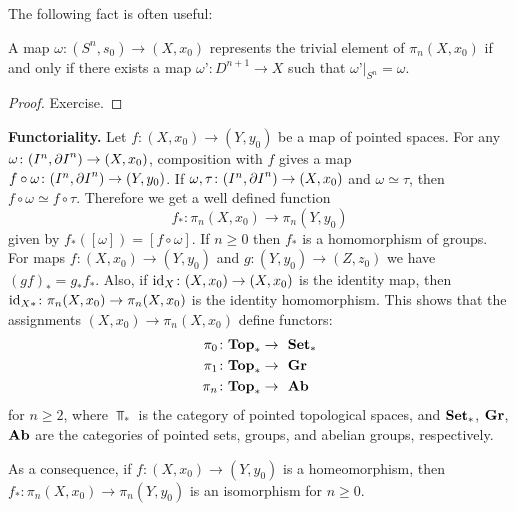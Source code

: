The following fact is often useful:

\begin{proposition}
\label{PIN TRIVAL ELT}
A map $\omega \colon (S^{n}, s_{0}) \to (X, x_{0})$ represents the trivial 
element of $\pi_{n}(X, x_{0})$ if and only if there exists a map 
$\omega’\colon D^{n+1} \to X$ such that $\omega’|_{S^{n}} = \omega$.
\end{proposition}

\begin{proof}
Exercise.
\end{proof}


\begin{nn} {\bf Functoriality.}
Let $f\colon (X, x_{0}) \to (Y, y_{0})$ be a map of pointed spaces. 
For any $\omega\colon (I^{n}, {\partial I}^{n})\to (X, x_{0})$, composition with 
$f$ gives a map $f\circ \omega \colon (I^{n}, {\partial I}^{n}) \to (Y, y_{0})$. 
If $\omega,  \tau \colon (I^{n}, {\partial I}^{n})\to (X, x_{0})$ and $\omega \simeq \tau$, 
then $f\circ \omega\simeq f\circ \tau$. Therefore we get a well defined function
\[
f_{\ast}\colon \pi_{n}(X, x_{0}) \to \pi_{n}(Y, y_{0})
\]
given by $f_{\ast}([\omega]) = [f\circ \omega ]$. If $n\geq 0$ then  $f_{\ast}$
is a homomorphism of groups. For maps $f\colon (X, x_{0}) \to (Y, y_{0})$
and $g\colon (Y, y_{0}) \to (Z, z_{0})$ we have $(gf)_{\ast} = g_{\ast}f_{\ast}$. 
Also, if $\mathrm{id}_{X}\colon (X, x_{0}) \to (X, x_{0})$ is the identity map, then
$\mathrm{id}_{X\ast}\colon \pi_{n}(X, x_{0}) \to \pi_{n}(X, x_{0})$ is the identity homomorphism. 
This shows that the assignments $(X, x_{0})\to \pi_{n}(X, x_{0})$ define functors:
\begin{align*}
\pi_{0}\colon {\mathbf{Top}}_{\ast} \to &\ \  {\mathbf{Set}}_{\ast} \\
\pi_{1}\colon {\mathbf{Top}}_{\ast} \to &\ \  {\mathbf{Gr}}  \\
\pi_{n}\colon {\mathbf{Top}}_{\ast} \to &\ \  {\mathbf{Ab}}  \\
\end{align*}
\vskip -8mm
for $n\geq 2$, where $\Top_{\ast}$ is the category of pointed topological spaces, 
and ${\mathbf{Set}}_{\ast}$, ${\mathbf{Gr}}$, ${\mathbf{Ab}}$ are the categories of pointed sets, groups, and 
abelian groups, respectively.

As a consequence, if $f\colon (X, x_{0}) \to (Y, y_{0})$ is a homeomorphism, 
then $f_{\ast}\colon \pi_{n}(X, x_{0}) \to \pi_{n}(Y, y_{0})$ is an isomorphism 
for $n\geq 0$. 
\end{nn}




